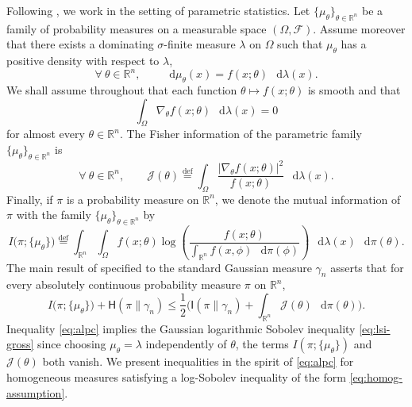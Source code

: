 \documentclass[a4paper,twoside,11pt,reqno]{amsart}
\newcommand{\eqdef}{\stackrel{\mathrm{def}}{=}}
\newcommand*\diff{\mathop{}\!\mathrm{d}}
\newcommand{\R}{\mathbb{R}} %
\newcommand{\ms}{\mathscr}
\newcommand{\II}{\mathsf{I}}
\newcommand{\HH}{\mathsf{H}}
\begin{document}
Following \cite{ALPC19}, we work in the setting of parametric statistics. Let $\{\mu_\theta\}_{\theta\in\R^n}$ be a family of probability measures on a measurable space $(\Omega,\ms{F})$. Assume moreover that there exists a dominating $\sigma$-finite measure $\lambda$ on $\Omega$ such that $\mu_\theta$ has a positive density with respect to $\lambda$,
\begin{equation}
\forall \ \theta\in\R^n, \qquad \diff\mu_\theta(x) = f(x;\theta)\,\diff\lambda(x).
\end{equation}
We shall assume throughout that each function $\theta\mapsto f(x;\theta)$ is smooth and that
\begin{equation} \label{eq:regu}
\int_\Omega \nabla_\theta f(x;\theta) \,\diff\lambda(x) = 0
\end{equation}
for almost every $\theta\in\R^n$. The Fisher information of the parametric family $\{\mu_\theta\}_{\theta\in\R^n}$ is
\begin{equation}
\forall \ \theta\in\R^n,\qquad \ms{J}(\theta) \eqdef \int_\Omega \frac{|\nabla_\theta f(x;\theta)|^2}{f(x;\theta)}\,\diff\lambda(x).
\end{equation}
Finally, if $\pi$ is a probability measure on $\R^n$, we denote the mutual information of $\pi$ with the family $\{\mu_\theta\}_{\theta\in\R^n}$ by
\begin{equation}
I\big(\pi;\{\mu_\theta\}\big) \eqdef \int_{\R^n} \int_\Omega f(x;\theta) \log \left(\frac{f(x;\theta)}{\int_{\R^n} f(x,\phi)\,\diff\pi(\phi)}\right) \,\diff\lambda(x) \,\diff\pi(\theta).
\end{equation}
The main result of \cite[Theorem~1]{ALPC19} specified to the standard Gaussian measure $\gamma_n$ asserts that for every absolutely continuous probability measure $\pi$ on $\R^n$,
\begin{equation} \label{eq:alpc}
I\big(\pi;\{\mu_\theta\}\big) + \HH(\pi\|\gamma_n) \leq \frac{1}{2}\Big( \II(\pi\|\gamma_n) + \int_{\R^n} \ms{J}(\theta)\,\diff\pi(\theta) \Big).
\end{equation}
Inequality \eqref{eq:alpc} implies the Gaussian logarithmic Sobolev inequality \eqref{eq:lsi-gross} since choosing $\mu_\theta=\lambda$ independently of $\theta$, the terms $I(\pi;\{\mu_\theta\})$ and $\ms{J}(\theta)$ both vanish. We present inequalities in the spirit of \eqref{eq:alpc} for homogeneous measures satisfying a log-Sobolev inequality of the form \eqref{eq:homog-assumption}.
\end{document}
